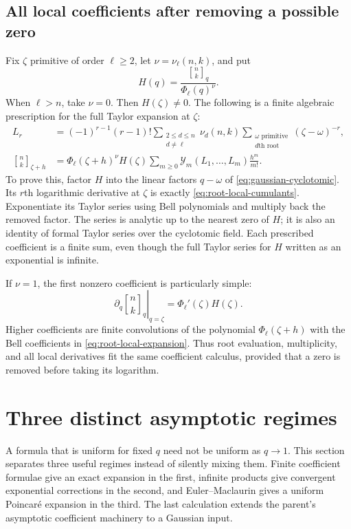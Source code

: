 \documentclass[11pt,a4paper]{article}
\numberwithin{equation}{section}
\theoremstyle{definition}
\theoremstyle{remark}
\newcommand{\G}[2]{\genfrac{[}{]}{0pt}{}{#1}{#2}_{q}}
\newcommand{\Gb}[3]{\genfrac{[}{]}{0pt}{}{#1}{#2}_{#3}}
\newcommand{\Y}{\mathcal Y}
\begin{document}
\subsection{All local coefficients after removing a possible zero}
Fix $\zeta$ primitive of order $\ell\ge2$, let
$\nu=\nu_\ell(n,k)$, and put
\[
 H(q)=\frac{\G nk}{\Phi_\ell(q)^\nu}.
\]
When $\ell>n$, take $\nu=0$. Then $H(\zeta)\ne0$. The following is a
finite algebraic prescription for the full Taylor expansion at $\zeta$:
\begin{align}
 L_r&=(-1)^{r-1}(r-1)!
      \sum_{\substack{2\le d\le n\\d\ne\ell}}\nu_d(n,k)
      \sum_{\substack{\omega\text{ primitive}\\d\text{th root}}}
                         (\zeta-\omega)^{-r},
 \label{eq:root-local-cumulants}\\
 \Gb nk{\zeta+h}
   &=\Phi_\ell(\zeta+h)^\nu H(\zeta)
        \sum_{m\ge0}\Y_m(L_1,\ldots,L_m)\frac{h^m}{m!}.
 \label{eq:root-local-expansion}
\end{align}
To prove this, factor $H$ into the linear factors $q-\omega$ of
\cref{eq:gaussian-cyclotomic}. Its $r$th logarithmic derivative at
$\zeta$ is exactly \cref{eq:root-local-cumulants}. Exponentiate its
Taylor series using Bell polynomials and multiply back the removed
factor. The series is analytic up to the nearest zero of $H$; it is
also an identity of formal Taylor series over the cyclotomic field.
Each prescribed coefficient is a finite sum, even though the full
Taylor series for $H$ written as an exponential is infinite.

If $\nu=1$, the first nonzero coefficient is particularly simple:
\begin{equation}
 \left.\partial_q\G nk\right|_{q=\zeta}
       =\Phi_\ell'(\zeta)H(\zeta).
 \label{eq:root-simple-derivative}
\end{equation}
Higher coefficients are finite convolutions of the polynomial
$\Phi_\ell(\zeta+h)$ with the Bell coefficients in
\cref{eq:root-local-expansion}. Thus root evaluation, multiplicity,
and all local derivatives fit the same coefficient calculus, provided
that a zero is removed before taking its logarithm.

\section{Three distinct asymptotic regimes}
\label{sec:asymptotic}
A formula that is uniform for fixed $q$ need not be uniform as $q\to1$.
This section separates three useful regimes instead of silently mixing
them. Finite coefficient formulae give an exact expansion in the first,
infinite products give convergent exponential corrections in the
second, and Euler--Maclaurin gives a uniform Poincar\'e expansion in the
third. The last calculation extends the parent's asymptotic
coefficient machinery to a Gaussian input.
\end{document}
